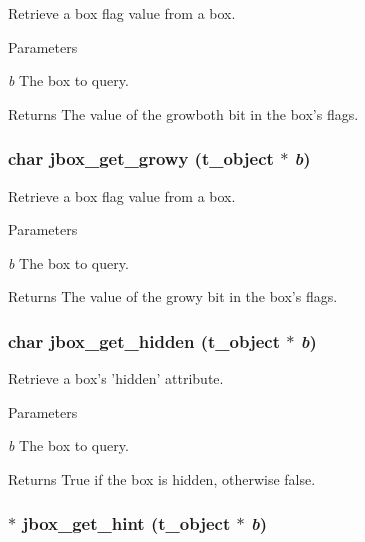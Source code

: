 Retrieve a box flag value from a box. 
\begin{DoxyParams}{Parameters}
\item[{\em b}]The box to query. \end{DoxyParams}
\begin{DoxyReturn}{Returns}
The value of the growboth bit in the box's flags. 
\end{DoxyReturn}
\hypertarget{group__jbox_ga1c3005aebecc67a41d0abb0f0089a6cb}{
\subsubsection[{jbox\_\-get\_\-growy}]{\setlength{\rightskip}{0pt plus 5cm}char jbox\_\-get\_\-growy ({\bf t\_\-object} $\ast$ {\em b})}}
\label{group__jbox_ga1c3005aebecc67a41d0abb0f0089a6cb}


Retrieve a box flag value from a box. 
\begin{DoxyParams}{Parameters}
\item[{\em b}]The box to query. \end{DoxyParams}
\begin{DoxyReturn}{Returns}
The value of the growy bit in the box's flags. 
\end{DoxyReturn}
\hypertarget{group__jbox_gabf4d15efce29810349772db62c3b1341}{
\subsubsection[{jbox\_\-get\_\-hidden}]{\setlength{\rightskip}{0pt plus 5cm}char jbox\_\-get\_\-hidden ({\bf t\_\-object} $\ast$ {\em b})}}
\label{group__jbox_gabf4d15efce29810349772db62c3b1341}


Retrieve a box's 'hidden' attribute. 
\begin{DoxyParams}{Parameters}
\item[{\em b}]The box to query. \end{DoxyParams}
\begin{DoxyReturn}{Returns}
True if the box is hidden, otherwise false. 
\end{DoxyReturn}
\hypertarget{group__jbox_gad9614088919b6727e6ed7feebd83d065}{
\subsubsection[{jbox\_\-get\_\-hint}]{$\ast$ jbox\_\-get\_\-hint ({\bf t\_\-object} $\ast$ {\em b})}}
\label{group__jbox_gad9614088919b6727e6ed7feebd83d065}


